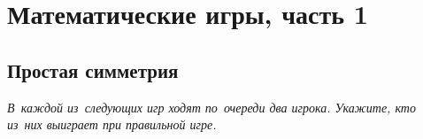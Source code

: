 

\section*{Математические игры, часть 1}



\subsection*{Простая симметрия}

\emph{%
В~каждой из~следующих игр ходят по~очереди два игрока.
Укажите, кто из~них выиграет при правильной игре.}

